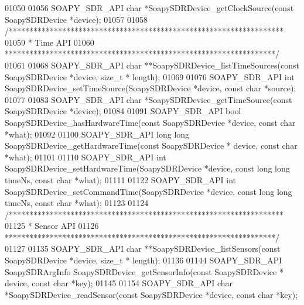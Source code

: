 \begin{DoxyCode}
01050 
01056 SOAPY_SDR_API \textcolor{keywordtype}{char} *SoapySDRDevice_getClockSource(\textcolor{keyword}{const} SoapySDRDevice *device);
01057 
01058 \textcolor{comment}{/*******************************************************************}
01059 \textcolor{comment}{ * Time API}
01060 \textcolor{comment}{ ******************************************************************/}
01061 
01068 SOAPY_SDR_API \textcolor{keywordtype}{char} **SoapySDRDevice_listTimeSources(\textcolor{keyword}{const} SoapySDRDevice *device, \textcolor{keywordtype}{size\_t} *
      length);
01069 
01076 SOAPY_SDR_API \textcolor{keywordtype}{int} SoapySDRDevice_setTimeSource(SoapySDRDevice *device, \textcolor{keyword}{const} \textcolor{keywordtype}{char} *source);
01077 
01083 SOAPY_SDR_API \textcolor{keywordtype}{char} *SoapySDRDevice_getTimeSource(\textcolor{keyword}{const} SoapySDRDevice *device);
01084 
01091 SOAPY_SDR_API \textcolor{keywordtype}{bool} SoapySDRDevice_hasHardwareTime(\textcolor{keyword}{const} SoapySDRDevice *device, \textcolor{keyword}{const} \textcolor{keywordtype}{char} *what);
01092 
01100 SOAPY_SDR_API \textcolor{keywordtype}{long} \textcolor{keywordtype}{long} SoapySDRDevice_getHardwareTime(\textcolor{keyword}{const} SoapySDRDevice *
      device, \textcolor{keyword}{const} \textcolor{keywordtype}{char} *what);
01101 
01110 SOAPY_SDR_API \textcolor{keywordtype}{int} SoapySDRDevice_setHardwareTime(SoapySDRDevice *device, \textcolor{keyword}{const} \textcolor{keywordtype}{long} \textcolor{keywordtype}{long} timeNs, \textcolor{keyword}{const} \textcolor{keywordtype}{char}
       *what);
01111 
01122 SOAPY_SDR_API \textcolor{keywordtype}{int} SoapySDRDevice_setCommandTime(SoapySDRDevice *device, \textcolor{keyword}{const} \textcolor{keywordtype}{long} \textcolor{keywordtype}{long} timeNs, \textcolor{keyword}{const} \textcolor{keywordtype}{char} 
      *what);
01123 
01124 \textcolor{comment}{/*******************************************************************}
01125 \textcolor{comment}{ * Sensor API}
01126 \textcolor{comment}{ ******************************************************************/}
01127 
01135 SOAPY_SDR_API \textcolor{keywordtype}{char} **SoapySDRDevice_listSensors(\textcolor{keyword}{const} SoapySDRDevice *device, \textcolor{keywordtype}{size\_t} *
      length);
01136 
01144 SOAPY_SDR_API SoapySDRArgInfo SoapySDRDevice_getSensorInfo(\textcolor{keyword}{const} SoapySDRDevice *
      device, \textcolor{keyword}{const} \textcolor{keywordtype}{char} *key);
01145 
01154 SOAPY_SDR_API \textcolor{keywordtype}{char} *SoapySDRDevice_readSensor(\textcolor{keyword}{const} SoapySDRDevice *device, \textcolor{keyword}{const} \textcolor{keywordtype}{char} *key);

\end{DoxyCode}
